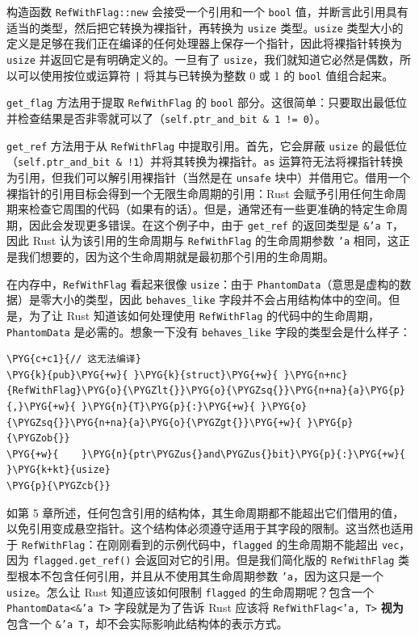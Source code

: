 构造函数 \texttt{RefWithFlag::new} 会接受一个引用和一个 \texttt{bool} 值，并断言此引用具有适当的类型，然后把它转换为裸指针，再转换为 \texttt{usize} 类型。\texttt{usize} 类型大小的定义是足够在我们正在编译的任何处理器上保存一个指针，因此将裸指针转换为 \texttt{usize} 并返回它是有明确定义的。一旦有了 \texttt{usize}，我们就知道它必然是偶数，所以可以使用按位或运算符 \texttt{|} 将其与已转换为整数 0 或 1 的 \texttt{bool} 值组合起来。

\texttt{get\_flag} 方法用于提取 \texttt{RefWithFlag} 的 \texttt{bool} 部分。这很简单：只要取出最低位并检查结果是否非零就可以了（\texttt{self.ptr\_and\_bit \& 1 != 0}）。

\texttt{get\_ref} 方法用于从 \texttt{RefWithFlag} 中提取引用。首先，它会屏蔽 \texttt{usize} 的最低位（\texttt{self.ptr\_and\_bit \& !1}）并将其转换为裸指针。\texttt{as} 运算符无法将裸指针转换为引用，但我们可以解引用裸指针（当然是在 \texttt{unsafe} 块中）并借用它。借用一个裸指针的引用目标会得到一个无限生命周期的引用：Rust 会赋予引用任何生命周期来检查它周围的代码（如果有的话）。但是，通常还有一些更准确的特定生命周期，因此会发现更多错误。在这个例子中，由于 \texttt{get\_ref} 的返回类型是 \texttt{\&'a T}，因此 Rust 认为该引用的生命周期与 \texttt{RefWithFlag} 的生命周期参数 \texttt{'a} 相同，这正是我们想要的，因为这个生命周期就是最初那个引用的生命周期。

在内存中，\texttt{RefWithFlag} 看起来很像 \texttt{usize}：由于 \texttt{PhantomData}（意思是虚构的数据）是零大小的类型，因此 \texttt{behaves\_like} 字段并不会占用结构体中的空间。但是，为了让 Rust 知道该如何处理使用 \texttt{RefWithFlag} 的代码中的生命周期，\texttt{PhantomData} 是必需的。想象一下没有 \texttt{behaves\_like} 字段的类型会是什么样子：

\begin{Verbatim}[commandchars=\\\{\},breaklines=true,breakanywhere=true,fontsize=\codefont,xleftmargin=17bp]
\PYG{c+c1}{// 这无法编译}
\PYG{k}{pub}\PYG{+w}{ }\PYG{k}{struct}\PYG{+w}{ }\PYG{n+nc}{RefWithFlag}\PYG{o}{\PYGZlt{}}\PYG{o}{\PYGZsq{}}\PYG{n+na}{a}\PYG{p}{,}\PYG{+w}{ }\PYG{n}{T}\PYG{p}{:}\PYG{+w}{ }\PYG{o}{\PYGZsq{}}\PYG{n+na}{a}\PYG{o}{\PYGZgt{}}\PYG{+w}{ }\PYG{p}{\PYGZob{}}
\PYG{+w}{    }\PYG{n}{ptr\PYGZus{}and\PYGZus{}bit}\PYG{p}{:}\PYG{+w}{ }\PYG{k+kt}{usize}
\PYG{p}{\PYGZcb{}}
\end{Verbatim}

如第 5 章所述，任何包含引用的结构体，其生命周期都不能超出它们借用的值，以免引用变成悬空指针。这个结构体必须遵守适用于其字段的限制。这当然也适用于 \texttt{RefWithFlag}：在刚刚看到的示例代码中，\texttt{flagged} 的生命周期不能超出 \texttt{vec}，因为 \texttt{flagged.get\_ref()} 会返回对它的引用。但是我们简化版的 \texttt{RefWithFlag} 类型根本不包含任何引用，并且从不使用其生命周期参数 \texttt{'a}，因为这只是一个 \texttt{usize}。怎么让 Rust 知道应该如何限制 \texttt{flagged} 的生命周期呢？包含一个 \texttt{PhantomData<\&'a T>} 字段就是为了告诉 Rust 应该将 \texttt{RefWithFlag<'a, T>} \textbf{视为}包含一个 \texttt{\&'a T}，却不会实际影响此结构体的表示方式。


